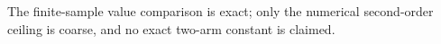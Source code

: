 The finite-sample value comparison is exact; only the numerical second-order ceiling is coarse, and no exact two-arm constant is claimed.